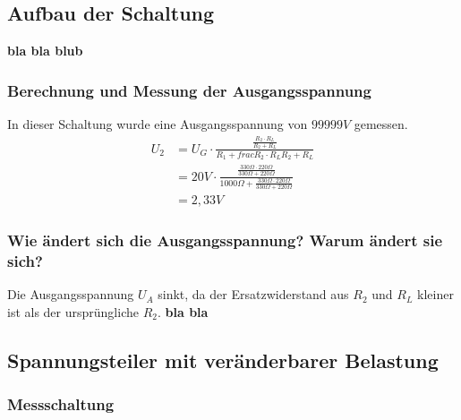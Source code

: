 \documentclass[
a4paper,     %
 headsepline, %
11pt         %
]{scrartcl}  %
\begin{document}
\subsection{Aufbau der Schaltung}

\textbf{bla bla blub}

\subsubsection{Berechnung und Messung der Ausgangsspannung}
In dieser Schaltung wurde eine Ausgangsspannung von \textbf{$99999V$} gemessen.
\begin{align}
U_2 &= U_G \cdot\frac{\frac{R_2 \cdot R_L}{R_2 + R_L}}{R_1 + frac{R_2 \cdot R_L}{R_2 + R_L}} \nonumber \\ 
	&= 20V \cdot\frac{\frac{330\Omega \cdot 220\Omega}{330\Omega + 220\Omega}}{1000\Omega + \frac{330\Omega \cdot 220\Omega}{330\Omega + 220\Omega}} \nonumber \\
	&= 2,33V
\end{align}

\subsubsection{Wie ändert sich die Ausgangsspannung? Warum ändert sie sich?}

Die Ausgangsspannung $U_A$ sinkt, da der Ersatzwiderstand aus $R_2$ und $R_L$ kleiner ist als der ursprüngliche $R_2$. \textbf{bla bla}

\subsection{Spannungsteiler mit veränderbarer Belastung}
\subsubsection{Messschaltung}
\end{document}
